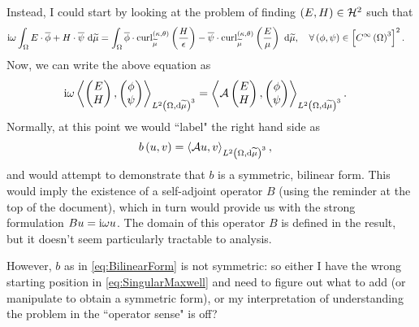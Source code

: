 \documentclass[11pt]{report}
\renewcommand{\ktcurl}[1]{\mathrm{curl}^{\kt}_{\dddmes}\bracs{#1}}
\newcommand{\hone}{\mathcal{H}}
\newcommand{\ip}[2]{\left\langle #1 , #2 \right\rangle}
\newcommand{\aop}{\mathcal{A}}
\begin{document}
Instead, I could start by looking at the problem of finding $\bracs{E,H}\in\hone^2$ such that
\begin{align*}
	\rmi\omega\integral{\ddom}{ E\cdot\overline{\phi} + H\cdot\overline{\psi} }{\dddmes}
	&= \integral{\ddom}{ \overline{\phi}\cdot\ktcurl{\frac{H}{\epsilon}} - \overline{\psi}\cdot\ktcurl{\frac{E}{\mu}} }{\dddmes},
	\quad\forall \bracs{\phi, \psi}\in\sqbracs{ \smooth{\ddom}^3 }^2.
\end{align*}
Now, we can write the above equation as
\begin{align*}
	\rmi\omega\ip{ \begin{pmatrix} E \\ H \end{pmatrix} }{ \begin{pmatrix} \phi \\ \psi \end{pmatrix} }_{\ltwo{\ddom}{\dddmes}^3}
	&= \ip{ \aop\begin{pmatrix} E \\ H \end{pmatrix} }{ \begin{pmatrix} \phi \\ \psi \end{pmatrix} }_{\ltwo{\ddom}{\dddmes}^3}.
\end{align*}
Normally, at this point we would ``label" the right hand side as
\begin{align} \label{eq:BilinearForm}
	b\bracs{u,v} &= \ip{ \aop u }{ v }_{\ltwo{\ddom}{\dddmes}^3},
\end{align}
and would attempt to demonstrate that $b$ is a symmetric, bilinear form.
This would imply the existence of a self-adjoint operator $B$ (using the reminder at the top of the document), which in turn would provide us with the strong formulation $Bu = \mathrm{i}\omega u$.
The domain of this operator $B$ is defined in the result, but it doesn't seem particularly tractable to analysis.

However, $b$ as in \eqref{eq:BilinearForm} is not symmetric: so either I have the wrong starting position in \eqref{eq:SingularMaxwell} and need to figure out what to add (or manipulate to obtain a symmetric form), or my interpretation of understanding the problem in the ``operator sense" is off?
\end{document}
